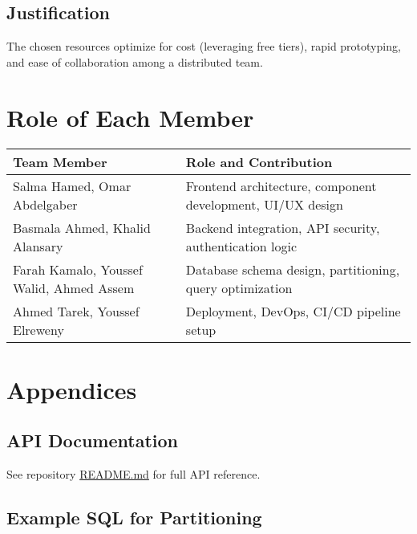 \documentclass[12pt,a4paper]{report}
\begin{document}
\section{Justification}
The chosen resources optimize for cost (leveraging free tiers), rapid prototyping, and ease of collaboration among a distributed team.

\chapter{Role of Each Member}
\begin{longtable}{|p{}|p{}|}
    \hline
    \textbf{Team Member} & \textbf{Role and Contribution} \\
    \hline
    Salma Hamed, Omar Abdelgaber & Frontend architecture, component development, UI/UX design \\
    Basmala Ahmed, Khalid Alansary & Backend integration, API security, authentication logic \\
    Farah Kamalo, Youssef Walid, Ahmed Assem & Database schema design, partitioning, query optimization \\
    Ahmed Tarek, Youssef Elreweny & Deployment, DevOps, CI/CD pipeline setup \\
    \hline
\end{longtable}

\chapter{Appendices}
\section{API Documentation}
See repository \href{https://github.com/KhalidAlansary/Jelato}{README.md} for full API reference.

\section{Example SQL for Partitioning}
\end{document}
